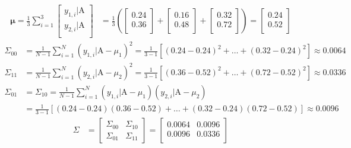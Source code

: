 \documentclass[12pt]{article}
\begin{document}
\begin{enumerate}[leftmargin=\labelsep]
\begin{enumerate}
          $$
              \begin{aligned}
                  \boldsymbol{\mu} = \frac{1}{3} \sum^{3}_{i=1} \begin{bmatrix}y_{1,i} | \text{A} \\y_{2,i} | \text{A} \\\end{bmatrix} & =
                      \frac{1}{3}
                      \left(\begin{bmatrix}0.24 \\0.36 \\\end{bmatrix} +
                      \begin{bmatrix}0.16 \\0.48 \\\end{bmatrix} +
                      \begin{bmatrix}0.32 \\0.72 \\\end{bmatrix}\right)
                      = \begin{bmatrix}0.24 \\0.52 \\\end{bmatrix}
              \end{aligned}
          $$
          $$
              \begin{aligned}
                  \Sigma_{00} & = \frac{1}{N-1} \sum^{N}_{i=1} (y_{1,i} | \text{A} - \mu_{1})^2 = \frac{1}{3-1} \left[(0.24-0.24)^2 + \dots + (0.32-0.24)^2\right] \approx 0.0064 \\
                  \Sigma_{11} & = \frac{1}{N-1} \sum^{N}_{i=1} (y_{2,i} | \text{A} - \mu_{2})^2 = \frac{1}{3-1} \left[(0.36-0.52)^2 + \dots + (0.72-0.52)^2\right] \approx 0.0336 \\
                  \Sigma_{01} & = \Sigma_{10} = \frac{1}{N-1} \sum^{N}_{i=1} (y_{1,i} | \text{A} - \mu_{1})(y_{2,i} | \text{A} - \mu_{2}) \\
                              & = \frac{1}{3-1} \left[(0.24-0.24)(0.36-0.52) + \dots + (0.32-0.24)(0.72-0.52)\right] \approx 0.0096
              \end{aligned}
          $$
          $$
              \begin{aligned}
                  \Sigma & = \begin{bmatrix}\Sigma_{00} & \Sigma_{10}\\ \Sigma_{01} & \Sigma_{11}\end{bmatrix} = \begin{bmatrix}0.0064 & 0.0096 \\0.0096 & 0.0336 \\\end{bmatrix}
              \end{aligned}
          $$


\end{enumerate}
\end{enumerate}
\end{document}
